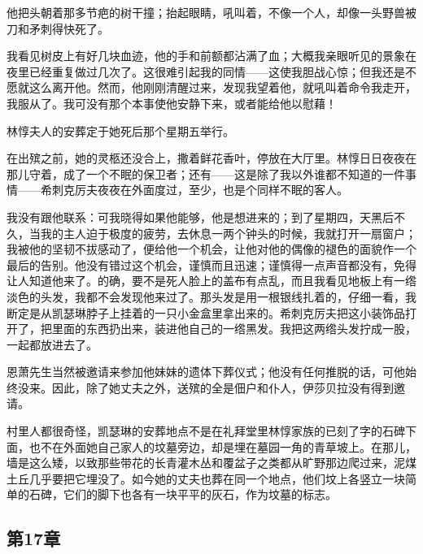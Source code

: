 \par 他把头朝着那多节疤的树干撞；抬起眼睛，吼叫着，不像一个人，却像一头野兽被刀和矛刺得快死了。
\par 我看见树皮上有好几块血迹，他的手和前额都沾满了血；大概我亲眼听见的景象在夜里已经重复做过几次了。这很难引起我的同情——这使我胆战心惊；但我还是不愿就这么离开他。然而，他刚刚清醒过来，发现我望着他，就吼叫着命令我走开，我服从了。我可没有那个本事使他安静下来，或者能给他以慰藉！
\par 林惇夫人的安葬定于她死后那个星期五举行。
\par 在出殡之前，她的灵柩还没合上，撒着鲜花香叶，停放在大厅里。林惇日日夜夜在那儿守着，成了一个不眠的保卫者；还有——这是除了我以外谁都不知道的一件事情——希刺克厉夫夜夜在外面度过，至少，也是个同样不眠的客人。
\par 我没有跟他联系：可我晓得如果他能够，他是想进来的；到了星期四，天黑后不久，当我的主人迫于极度的疲劳，去休息一两个钟头的时候，我就打开一扇窗户；我被他的坚韧不拔感动了，便给他一个机会，让他对他的偶像的褪色的面貌作一个最后的告别。他没有错过这个机会，谨慎而且迅速；谨慎得一点声音都没有，免得让人知道他来了。的确，要不是死人脸上的盖布有点乱，而且我看见地板上有一绺淡色的头发，我都不会发现他来过了。那头发是用一根银线扎着的，仔细一看，我断定是从凯瑟琳脖子上挂着的一只小金盒里拿出来的。希刺克厉夫把这小装饰品打开了，把里面的东西扔出来，装进他自己的一绺黑发。我把这两绺头发拧成一股，一起都放进去了。
\par 恩萧先生当然被邀请来参加他妹妹的遗体下葬仪式；他没有任何推脱的话，可他始终没来。因此，除了她丈夫之外，送殡的全是佃户和仆人，伊莎贝拉没有得到邀请。
\par 村里人都很奇怪，凯瑟琳的安葬地点不是在礼拜堂里林惇家族的已刻了字的石碑下面，也不在外面她自己家人的坟墓旁边，却是埋在墓园一角的青草坡上。在那儿，墙是这么矮，以致那些带花的长青灌木丛和覆盆子之类都从旷野那边爬过来，泥煤土丘几乎要把它埋没了。如今她的丈夫也葬在同一个地点，他们坟上各竖立一块简单的石碑，它们的脚下也各有一块平平的灰石，作为坟墓的标志。


\subsection{第17章}

